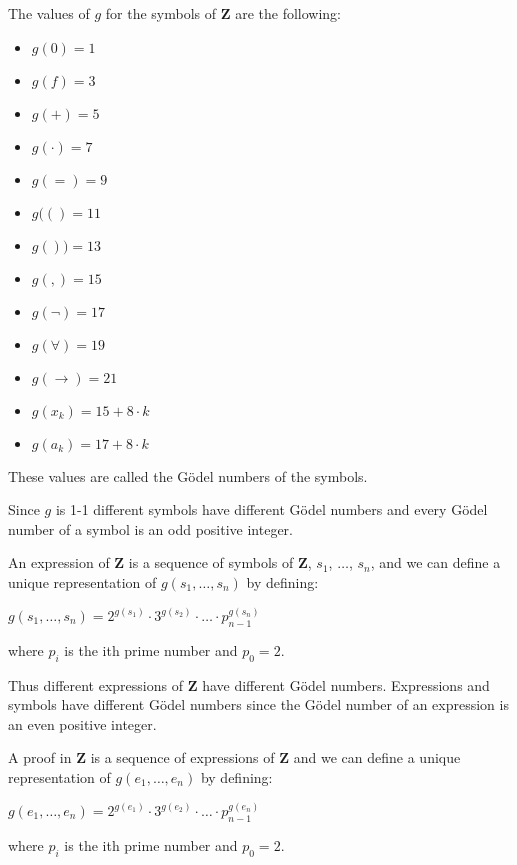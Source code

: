 \documentclass[12pt]{article}
\begin{document}
The values of $g$ for the symbols of $\textbf{Z}$ are the following:

\begin{itemize}
\item $g (0) = 1$ 
\item $g (f) = 3$ 
\item $g (+) = 5$ 
\item $g (\cdot) = 7$
\item $g (=) = 9$
\item $g (() = 11$
\item $g ()) = 13$ 
\item $g (,) = 15$ 
\item $g (\neg) = 17$
\item $g (\forall) = 19$
\item $g (\rightarrow) = 21$
\item $g (x_k) = 15 + 8 \cdot k$
\item $g (a_k) = 17 + 8 \cdot k$
\end{itemize}

These values are called the G\"{o}del numbers of the symbols.

Since $g$ is 1-1 different symbols have different G\"{o}del numbers and every G\"{o}del number of a symbol is an odd positive integer.

An expression of $\textbf{Z}$ is a sequence of symbols of $\textbf{Z}$, $s_1$, $\ldots$, $s_n$, and we can define a unique representation of $g (s_1, \ldots, s_n)$ by defining:

\begin{center}
$g (s_1, \ldots, s_n) = 2^{g(s_1)} \cdot 3^{g(s_2)} \cdot \ldots \cdot p^{g(s_n)}_{n-1}$
\end{center}
 
where $p_i$ is the ith prime number and $p_0 = 2$.

Thus different expressions of $\textbf{Z}$ have different G\"{o}del numbers. Expressions and symbols have different G\"{o}del numbers since the G\"{o}del number of an expression is an even positive integer.

A proof in $\textbf{Z}$ is a sequence of expressions of $\textbf{Z}$ and we can define a unique representation of $g (e_1, \ldots, e_n)$ by defining:

\begin{center}
$g(e_1, \ldots, e_n) = 2^{g(e_1)} \cdot 3^{g(e _2)} \cdot \ldots \cdot p^{g(e_n)}_{n-1}$
\end{center}

where $p_i$ is the ith prime number and $p_0 = 2$.
\end{document}
